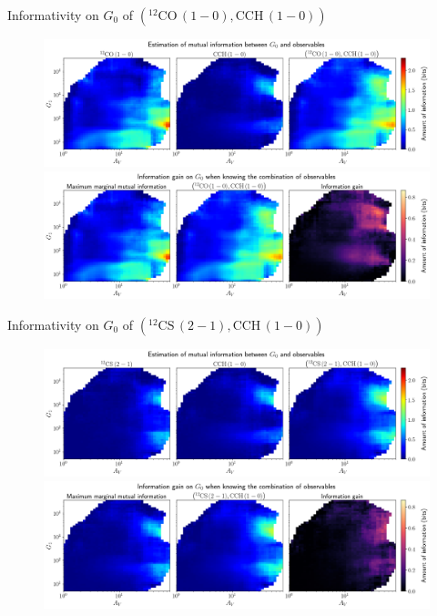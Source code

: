 \documentclass{beamer}
\begin{document}
\begin{frame}{Informativity on $G_0$ of $\left(\mathrm{^{12}CO\,(1-0)},\mathrm{CCH\,(1-0)}\right)$}
    \begin{figure}
        \centering
        \includegraphics[width=0.95\linewidth]{../mi/g0__12co10_cch10_mi.png}
        \vfill
        \includegraphics[width=0.95\linewidth]{../mi/g0__12co10_cch10_mi_gain.png}
    \end{figure}
\end{frame}

\begin{frame}{Informativity on $G_0$ of $\left(\mathrm{^{12}CS\,(2-1)},\mathrm{CCH\,(1-0)}\right)$}
    \begin{figure}
        \centering
        \includegraphics[width=0.95\linewidth]{../mi/g0__12cs21_cch10_mi.png}
        \vfill
        \includegraphics[width=0.95\linewidth]{../mi/g0__12cs21_cch10_mi_gain.png}
    \end{figure}
\end{frame}
\end{document}
